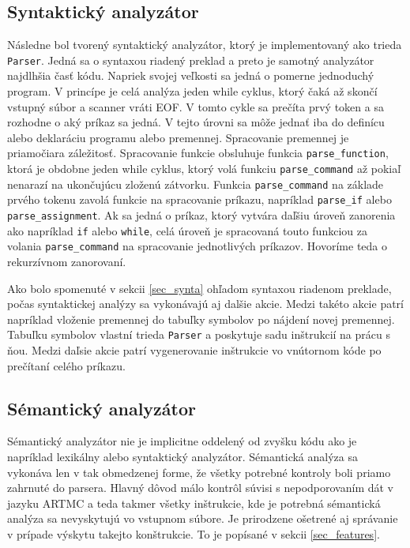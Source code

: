 \subsection{Syntaktický analyzátor}
Následne bol tvorený syntaktický analyzátor, ktorý je implementovaný ako trieda \texttt{Parser}. Jedná sa o syntaxou riadený preklad a preto je samotný analyzátor najdlhšia časť kódu. Napriek svojej veľkosti sa jedná o pomerne jednoduchý program. V princípe je celá analýza jeden while cyklus, ktorý čaká až skončí vstupný súbor a scanner vráti EOF. V tomto cykle sa prečíta prvý token a sa rozhodne o aký príkaz sa jedná. V tejto úrovni sa môže jednať iba do definícu alebo deklaráciu programu alebo premennej. Spracovanie premennej je priamočiara záležitosť. Spracovanie funkcie obsluhuje funkcia \texttt{parse\_function}, ktorá je obdobne jeden while cyklus, ktorý volá funkciu \texttt{parse\_command} až pokiaľ nenarazí na ukončujúcu zloženú zátvorku. Funkcia \texttt{parse\_command}
na základe prvého tokenu zavolá funkcie na spracovanie príkazu, napríklad \texttt{parse\_if} alebo \texttt{parse\_assignment}. Ak sa jedná o príkaz, ktorý vytvára daľšiu úroveň zanorenia ako napríklad \texttt{if} alebo \texttt{while}, celá úroveň je spracovaná touto funkciou za volania  \texttt{parse\_command} na spracovanie jednotlivých príkazov. Hovoríme teda o rekurzívnom zanorovaní.

Ako bolo spomenuté v sekcii \ref{sec_synta} ohľadom syntaxou riadenom preklade, počas syntaktickej analýzy sa vykonávajú aj dalšie akcie. Medzi takéto akcie patrí napríklad vloženie premennej do tabuľky symbolov po nájdení novej premennej. Tabuľku symbolov vlastní trieda \texttt{Parser} a poskytuje sadu inštrukcií na prácu s ňou. Medzi daľsie akcie patrí vygenerovanie inštrukcie vo vnútornom kóde po prečítaní celého príkazu. 

\subsection{Sémantický analyzátor}
Sémantický analyzátor nie je implicitne oddelený od zvyšku kódu ako je napríklad lexikálny alebo syntaktický analyzátor. Sémantická analýza sa vykonáva len v tak obmedzenej forme, že všetky potrebné kontroly boli priamo zahrnuté do parsera. Hlavný dôvod málo kontrôl súvisi s nepodporovaním dát v jazyku ARTMC a teda takmer všetky inštrukcie, kde je potrebná sémantická analýza sa nevyskytujú vo vstupnom súbore. Je prirodzene ošetrené aj správanie v prípade výskytu takejto konštrukcie. To je popísané v sekcii \ref{sec_features}.

